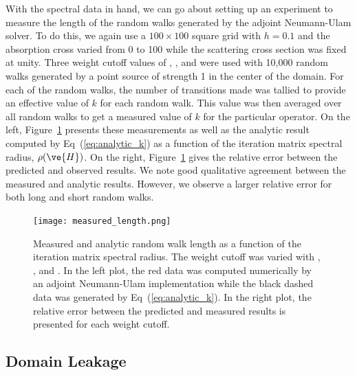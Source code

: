 \documentclass[preprint,11pt]{elsarticle}
\begin{document}
With the spectral data in hand, we can go about setting up an experiment to
measure the length of the random walks generated by the adjoint Neumann-Ulam
solver. To do this, we again use a $100 \times 100$ square grid with $h=0.1$
and the absorption cross varied from 0 to 100 while the scattering cross
section was fixed at unity. Three weight cutoff values of ,
, and  were used with 10,000 random walks generated by a
point source of strength 1 in the center of the domain. For each of the
random walks, the number of transitions made was tallied to provide an effective
value of $k$ for each random walk. This value was then averaged over all random walks
to get a measured value of $k$ for the particular operator. On the left,
Figure~\ref{fig:measured_length} presents these measurements as well as the
analytic result computed by Eq~(\ref{eq:analytic_k}) as a function of the
iteration matrix spectral radius, $\rho(\ve{H})$. On the right,
Figure~\ref{fig:measured_length} gives the relative error between the
predicted and observed results. We note good qualitative agreement between the
measured and analytic results. However, we observe a larger relative error for
both long and short random walks.
\begin{figure}[ht!]
  \begin{center}
    \texttt{[image: measured\_length.png]}
  \end{center}
  \caption{Measured and analytic random walk length as a function of
    the iteration matrix spectral radius. The weight cutoff was
    varied with , , and . In the left
    plot, the red data was computed numerically by an adjoint
    Neumann-Ulam implementation while the black dashed data was
    generated by Eq~(\ref{eq:analytic_k}). In the right plot, the
    relative error between the predicted and measured results is
    presented for each weight cutoff.}
  \label{fig:measured_length}
\end{figure}

\subsection{Domain Leakage}
\label{subsec:domain_leakage}
\end{document}
